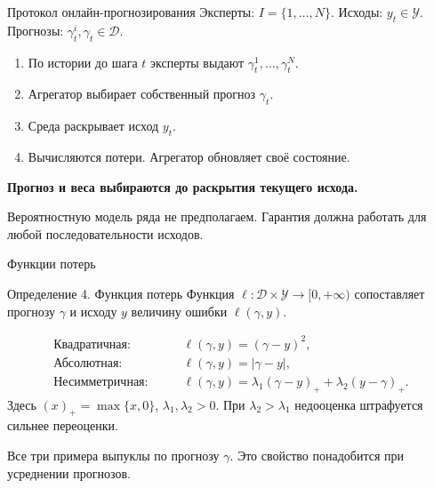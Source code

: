 \documentclass[11pt,aspectratio=169]{beamer}
\begin{document}
\begin{frame}{Протокол онлайн-прогнозирования}
  Эксперты: $I=\{1,\ldots,N\}$. Исходы: $y_t\in\mathcal Y$.
  Прогнозы: $\gamma_t^i,\gamma_t\in\mathcal D$.
  \medskip
  \begin{enumerate}
    \item По истории до шага $t$ эксперты выдают $\gamma_t^1,\ldots,\gamma_t^N$.
    \item Агрегатор выбирает собственный прогноз $\gamma_t$.
    \item Среда раскрывает исход $y_t$.
    \item Вычисляются потери. Агрегатор обновляет своё состояние.
  \end{enumerate}
  \par\medskip\textbf{Прогноз и веса выбираются до раскрытия текущего исхода.}
  \par\vfill{\scriptsize Вероятностную модель ряда не предполагаем. Гарантия должна работать для любой последовательности исходов.\par}
\end{frame}
\begin{frame}{Функции потерь}
  \begin{block}{Определение 4. Функция потерь}
    Функция $\ell:\mathcal D\times\mathcal Y\to[0,+\infty)$
    сопоставляет прогнозу $\gamma$ и исходу $y$ величину ошибки $\ell(\gamma,y)$.
  \end{block}
  \begin{align*}
    \text{Квадратичная:}\qquad &\ell(\gamma,y)=(\gamma-y)^2,\\[2mm]
    \text{Абсолютная:}\qquad &\ell(\gamma,y)=|\gamma-y|,\\[2mm]
    \text{Несимметричная:}\qquad
      &\ell(\gamma,y)=\lambda_1(\gamma-y)_++\lambda_2(y-\gamma)_+.
  \end{align*}
  Здесь $(x)_+=\max\{x,0\}$, $\lambda_1,\lambda_2>0$.
  При $\lambda_2>\lambda_1$ недооценка штрафуется сильнее переоценки.
  \par\vfill{\scriptsize Все три примера выпуклы по прогнозу $\gamma$. Это свойство понадобится при усреднении прогнозов.\par}
\end{frame}
\end{document}
